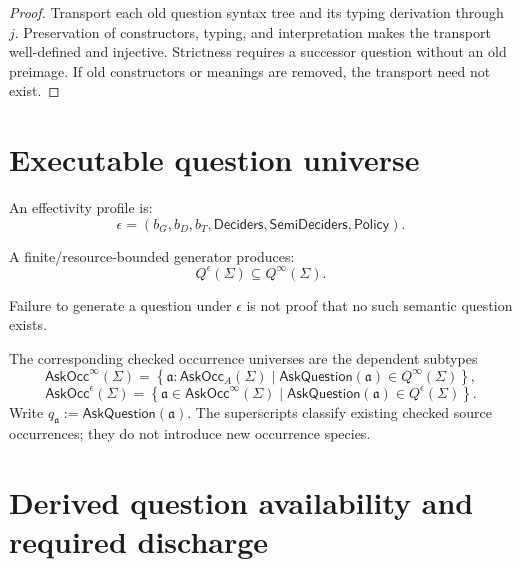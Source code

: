 \documentclass[11pt,oneside]{article}
\newcommand{\AskRef}{\mathfrak a}
\begin{document}
\begin{proof}
Transport each old question syntax tree and its typing derivation through \(j\).
Preservation of constructors, typing, and interpretation makes the transport
well-defined and injective.  Strictness requires a successor question without an old
preimage.  If old constructors or meanings are removed, the transport need not exist.
\end{proof}

\section{Executable question universe}

An effectivity profile is:
\[
\boxed{
\epsilon=
(
b_G,b_D,b_T,
\mathsf{Deciders},
\mathsf{SemiDeciders},
\mathsf{Policy}
).
}
\]

A finite/resource-bounded generator produces:
\[
Q^\epsilon(\Sigma)\subseteq Q^\infty(\Sigma).
\]

Failure to generate a question under \(\epsilon\) is not proof that no such semantic question exists.

The corresponding checked occurrence universes are the dependent subtypes
\[
\boxed{
\mathsf{AskOcc}^{\infty}(\Sigma)
=
\left\{
\AskRef:\mathsf{AskOcc}_A(\Sigma)
\mid
\mathsf{AskQuestion}(\AskRef)\in Q^\infty(\Sigma)
\right\},
}
\]
\[
\boxed{
\mathsf{AskOcc}^{\epsilon}(\Sigma)
=
\left\{
\AskRef\in\mathsf{AskOcc}^{\infty}(\Sigma)
\mid
\mathsf{AskQuestion}(\AskRef)\in Q^\epsilon(\Sigma)
\right\}.
}
\]
Write \(q_{\AskRef}:=\mathsf{AskQuestion}(\AskRef)\).  The superscripts classify existing checked
source occurrences; they do not introduce new occurrence species.

\section{Derived question availability and required discharge}
\end{document}
